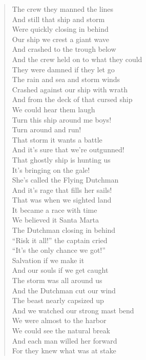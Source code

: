 \documentclass[11pt]{article}
\begin{document}
\begin{verse}
The crew they manned the lines\\
And still that ship and storm\\
Were quickly closing in behind\\
Our ship we crest a giant wave\\
And crashed to the trough below\\
And the crew held on to what they could\\
They were damned if they let go\\
The rain and sea and storm winds\\
Crashed against our ship with wrath\\
And from the deck of that cursed ship\\
We could hear them laugh\\
\vspace*{1em}
Turn this ship around me boys!\\
Turn around and run!\\
That storm it wants a battle\\
And it's sure that we're outgunned!\\
That ghostly ship is hunting us\\
It's bringing on the gale!\\
She's called the Flying Dutchman\\
And it's rage that fills her sails!\\
\vspace*{1em}
That was when we sighted land\\
It became a race with time\\
We believed it Santa Marta\\
The Dutchman closing in behind\\
``Risk it all!'' the captain cried\\
``It's the only chance we got!''\\
Salvation if we make it\\
And our souls if we get caught\\
The storm was all around us\\
And the Dutchman cut our wind\\
The beast nearly capsized up\\
And we watched our strong mast bend\\
We were almost to the harbor\\
We could see the natural break\\
And each man willed her forward\\
For they knew what was at stake\\

\end{verse}
\end{document}
